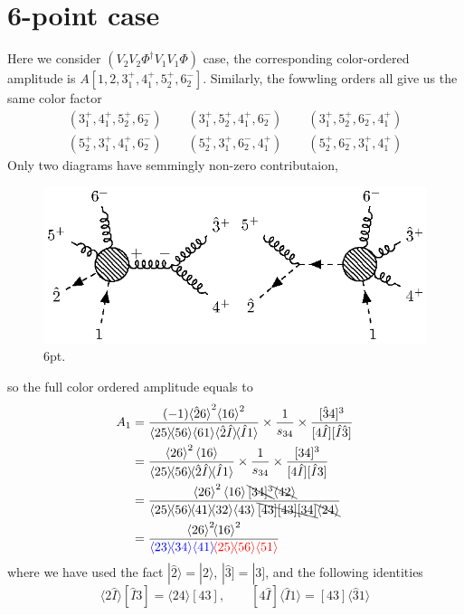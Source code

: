 \documentclass[12pt]{article}
\newcommand{\mdavg}[2]{\langle #1 \rangle\!\langle #2 \rangle}
\newcommand{\avg}[1]{\left\langle #1 \right\rangle}
\newcommand{\inavg}[2]{\langle #1 \rangle\! [#2]}
\newcommand{\rinavg}[2]{[#1]\!\langle #2 \rangle}
\newcommand{\aket}[1]{|#1\rangle}
\newcommand{\asqu}[1]{{\langle#1\rangle}^2}
\newcommand{\sket}[1]{|#1]}
\begin{document}
\section{6-point case}
Here we consider $(V_2V_2\Phi^\dagger V_1V_1 \Phi)$ case, the corresponding color-ordered amplitude is $A[1,2,3_1^+,4_1^+,5_2^+,6_2^-]$.
Similarly, the fowwling orders all give us the same color factor
\begin{gather*}
    (3_1^+,4_1^+,5_2^+,6_2^-)\qquad(3_1^+,5_2^+,4_1^+,6_2^-)\qquad (3_1^+,5_2^+,6_2^-,4_1^+)\\
    (5_2^+,3_1^+,4_1^+,6_2^-)\qquad(5_2^+,3_1^+,6_2^-,4_1^+)\qquad (5_2^+,6_2^-,3_1^+,4_1^+)
\end{gather*}
Only two diagrams have semmingly non-zero contributaion,
\par
\begin{figure}[H]
    \centering
    \includegraphics{6pt.eps}
    \caption{6pt.}
    \label{5}
\end{figure}
so the full color ordered amplitude equals to
\begin{align*}
    A_1&=\frac{(-1)\asqu{\hat{2}6}\asqu{16}}{\mdavg{25}{56}\!\avg{61}\!\mdavg{\hat{2}\hat{I}}{\hat{I}1}}\times\frac{1}{s_{34}}\times\frac{[\hat{3}4]^3}{[4\hat{I}][\hat{I}\hat{3}]}\\
    &=\frac{\asqu{26}\avg{16}}{\mdavg{25}{56}\!\mdavg{\hat{2}\hat{I}}{\hat{I}1}}\times\frac{1}{s_{34}}\times\frac{[34]^3}{[4\hat{I}][\hat{I}3]}\\
    &=\frac{\asqu{26}\avg{16}\bcancel{[34]^3}\bcancel{\avg{42}}}{\mdavg{25}{56}\!\mdavg{41}{32}\!\avg{43}\bcancel{[43][43][34]}\bcancel{\avg{24}}}\\
    &=\frac{\asqu{26}\!\asqu{16}}{\textcolor{blue}{\mdavg{23}{34}\!\avg{41}}\!\textcolor{red}{\mdavg{25}{56}\!\avg{51}}}
\end{align*}
where we have used the fact $\aket{\hat{2}}=\aket{2}$, $\sket{\hat{3}}=\sket{3}$, and the following identities
\begin{equation*}
    \inavg{2\hat{I}}{\hat{I}3}=\inavg{24}{43}, \qquad \rinavg{4\hat{I}}{\hat{I}1}=\rinavg{43}{\hat{3}1}
\end{equation*}
\end{document}
